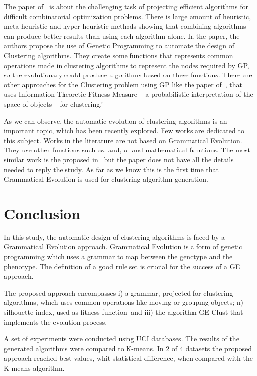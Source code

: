 \documentclass[conference,compsoc]{IEEEtran}
\begin{document}
The paper of~\cite{bolton2015optimizing} is about the challenging task of projecting efficient algorithms for difficult combinatorial optimization problems. There is large amount of heuristic, meta-heuristic and hyper-heuristic methods showing that combining algorithms can produce better results than using each algorithm alone. In the paper, the authors propose the use of Genetic Programming to automate the design of Clustering algorithms. They create some functions that represents common operations made in clustering algorithms to represent the nodes required by GP, so the evolutionary could produce algorithms based on these functions. There are other approaches for the Clustering problem using GP like the paper of~\cite{boric2007genetic}, that uses Information Theoretic Fitness Measure -- a probabilistic interpretation of the space of objects -- for clustering.'

As we can observe, the automatic evolution of clustering algorithms is an important topic, which has been recently explored. Few works are dedicated to this subject.   Works in the literature are not based on Grammatical Evolution. They use other functions such as:  and, or and mathematical functions. The most similar work is the proposed in~\cite{bolton2015optimizing} but the paper does not have all the details needed to reply the study.  As far as we know this is the first time that Grammatical Evolution is used for clustering algorithm generation. 


\section{Conclusion}
\label{sec:conclusion}


In this study, the automatic design of clustering algorithms is faced by a Grammatical Evolution approach. Grammatical Evolution is a form of genetic programming which uses a grammar to map between the genotype and the phenotype. The definition of a good rule set is crucial for the success of a GE approach. 

The proposed approach encompasses i) a grammar,  projected for clustering algorithms, which uses common operations like moving or grouping objects; ii)  silhouette index, used as fitness function; and iii) the algorithm GE-Clust that implements the evolution process. 

A set of experiments were conducted using UCI databases. The results of the generated algorithms were compared to K-means. In 2 of 4 datasets the proposed approach reached best values, whit statistical difference, when compared with the K-means algorithm.
\end{document}

